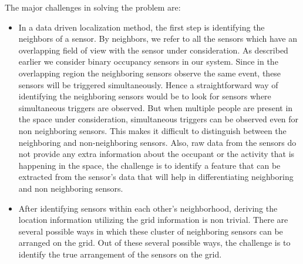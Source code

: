 The major challenges in solving the problem are:
\begin{itemize}
\item In a data driven localization method, the first step is identifying the neighbors of a sensor.
By neighbors, we refer to all the sensors which have an overlapping field of view with the sensor under consideration.
As described earlier we consider binary occupancy sensors in our system.
Since in the overlapping region the neighboring sensors observe the same event, these sensors will be triggered simultaneously.
Hence a straightforward way of identifying the neighboring sensors would be to look for sensors where simultaneous triggers are observed.
But when multiple people are present in the space under consideration, simultaneous triggers can be observed even for non neighboring sensors. 
This makes it difficult to distinguish between the neighboring and non-neighboring sensors.
Also, raw data from the sensors do not provide any extra information about the occupant or the activity that is happening in the space, the challenge is to identify a feature that can be extracted from the sensor's data that will help in differentiating neighboring and non neighboring sensors.
\item After identifying sensors within each other's neighborhood, deriving the location information utilizing the grid information is non trivial. 
There are several possible ways in which these cluster of neighboring sensors can be arranged on the grid. 
Out of these several possible ways, the challenge is to identify the true arrangement of the sensors on the grid.
\end{itemize}


